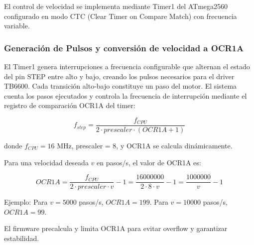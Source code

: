 El control de velocidad se implementa mediante Timer1 del ATmega2560 configurado en modo CTC (Clear Timer on Compare Match) con frecuencia variable.

\subsubsection{Generación de Pulsos y conversión de velocidad a OCR1A}

El Timer1 genera interrupciones a frecuencia configurable que alternan el estado del pin STEP entre alto y bajo, creando los pulsos necesarios para el driver TB6600. Cada transición alto-bajo constituye un paso del motor. El sistema cuenta los pasos ejecutados y controla la frecuencia de interrupción mediante el registro de comparación OCR1A del timer:

\begin{equation}
f_{step} = \frac{f_{CPU}}{2 \cdot prescaler \cdot (OCR1A + 1)}
\end{equation}

donde $f_{CPU} = 16$ MHz, prescaler = 8, y OCR1A se calcula dinámicamente.

Para una velocidad deseada $v$ en pasos/s, el valor de OCR1A es:

\begin{equation}
OCR1A = \frac{f_{CPU}}{2 \cdot prescaler \cdot v} - 1 = \frac{16000000}{2 \cdot 8 \cdot v} - 1 = \frac{1000000}{v} - 1
\end{equation}

Ejemplo: Para $v = 5000$ pasos/s, $OCR1A = 199$. Para $v = 10000$ pasos/s, $OCR1A = 99$.

El firmware precalcula y limita OCR1A para evitar overflow y garantizar estabilidad.